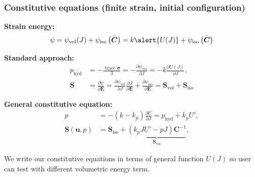 \documentclass{beamer}
\newcommand{\bm}{\boldsymbol}
\newcommand\bC{\bm C}
\newcommand\bulk{k}
\newcommand\trace{\operatorname{trace}}
\newcommand{\dd}[2]{\frac{\partial #1}{\partial #2}}
\begin{document}
\begin{frame}
	\frametitle{Constitutive equations (finite strain, initial configuration)}
	\textbf{Strain energy:}
	\begin{equation}
		\psi = \psi_{\text{vol}}(J) + \psi_{\text{iso}}\left(\bar{\bC} \right) = \bulk \alert{U(J)} + \psi_{\text{iso}}\left(\bar{\bC} \right) \nonumber
	\end{equation}
	
	\textbf{Standard approach:}
	\begin{equation}
		\begin{split}
			p_{\text{hyd}} &= - \frac{\trace \bm \sigma}{3} = - \dd{\psi_{\text{vol}}}{J} = -\bulk \dd{U(J)}{J}, \\ \nonumber
			\boldsymbol{S} &= \frac{\partial \psi}{\partial \boldsymbol{E}} =  \frac{\partial \psi_{\text{vol}}}{\partial J}  \frac{\partial J}{\partial \boldsymbol{E}} +  \frac{\partial \psi_{\text{iso}}}{\partial \boldsymbol{E}} = \boldsymbol{S}_{\text{vol}} + \boldsymbol{S}_{\text{iso}}
		\end{split}
	\end{equation}

	\textbf{General constitutive equation:}
	\begin{equation}
		\begin{split}
			p &= - (\bulk - \bulk_p) \dd{U}{J} = p_{\text{hyd}} + \bulk_p U', \\ \nonumber
			\bm S(\bm u, p) &= \bm S_{\text{iso}} + \underbrace{\left(\bulk_p J U'- p J \right) \bm{C}^{-1}}_{\bm S_{\text{vol}}}, 
		\end{split}
	\end{equation}
	
	\begin{tcolorbox}
		We write our constitutive equations in terms of general function \alert{$U(J)$} so user can test with different volumetric energy term.
	\end{tcolorbox}
\end{frame}
\end{document}
